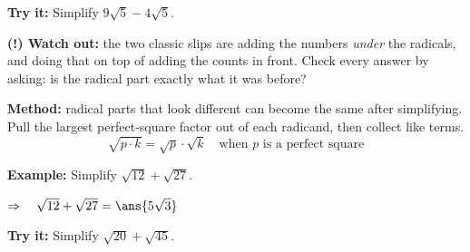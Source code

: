 \documentclass[12pt]{article}
\begin{document}
\begin{tryitbox}
\textbf{Try it:} \quad Simplify $9\sqrt{5} - 4\sqrt{5}$.\\[2pt]
\end{tryitbox}

\begin{watchoutbox}
\textbf{(!) Watch out:} the two classic slips are adding the numbers \emph{under} the
radicals, and doing that on top of adding the counts in front. Check every answer by
asking: is the radical part exactly what it was before?
\end{watchoutbox}


\begin{formulabox}
\textbf{Method:} radical parts that look different can become the same after simplifying.
Pull the largest perfect-square factor out of each radicand, then collect like terms.
\[ \sqrt{p \cdot k} = \sqrt{p} \cdot \sqrt{k} \quad\text{when } p \text{ is a perfect square} \]
\end{formulabox}

\begin{examplebox}
\textbf{Example:} \quad Simplify $\sqrt{12} + \sqrt{27}$.

$\Rightarrow\quad \sqrt{12} + \sqrt{27} = \ans{5\sqrt{3}}$
\end{examplebox}

\begin{tryitbox}
\textbf{Try it:} \quad Simplify $\sqrt{20} + \sqrt{45}$.\\[2pt]
\end{tryitbox}
\end{document}

